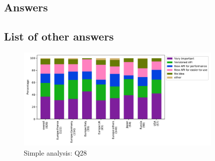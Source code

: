 
\subsection{Answers}


\subsection{List of other answers}
\begin{itemize}

\end{itemize}

\begin{figure}[htb]
\begin{center}
\includegraphics[width=10cm]{../pdfs/Q28.pdf}
\caption{Simple analysis: Q28}
\label{fig:Q28}
\end{center}
\end{figure}
